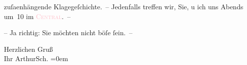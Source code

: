                   zuſa{\geminationm}enhängende Klagegeſchichte. – Jeden{\pb}falls treffen wir, Sie, u ich uns
                  Abends um 10 im \textsc{\textcolor{pink}{Central}{}\ledrightnote{\textcolor{pink}{Café Central}}}. –\pend
           
\pstart
           – Ja richtig: Sie möchten nicht böſe ſein. –\pend
           
\pstart
           Herzlichen Gruß {\\[\baselineskip]}Ihr \spacefill\mbox{ArthurSch.}\pend
           \leftskip=0em{}\endnumbering{}  
      